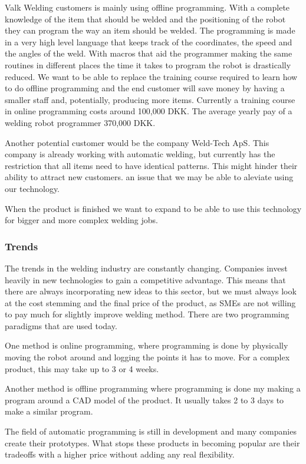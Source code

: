 Valk Welding customers is mainly using offline programming.
With a complete knowledge of the item that should be welded and the positioning of the robot they can program the way an item should be welded.
The programming is made in a very high level language that keeps track of the coordinates, the speed and the angles of the weld.
With macros that aid the programmer making the same routines in different places the time it takes to program the robot is drastically reduced.
We want to be able to replace the training course required to learn how to do offline programming and the end customer will save money by having a smaller staff and, potentially, producing more items. 
Currently a training course in online programming costs around 100,000 DKK\cite{valk_welding_summary}. 
The average yearly pay of a welding robot programmer 370,000 DKK\cite{welding_salary}. 

Another potential customer would be the company Weld-Tech ApS. 
This company is already working with automatic welding, but currently has the restriction that all items need to have identical patterns. 
This might hinder their ability to attract new customers. an issue that we may be able to aleviate using our technology.

When the product is finished we want to expand to be able to use this technology for bigger and more complex welding jobs.

\subsubsection{Trends}
The trends in the welding industry are constantly changing. 
Companies invest heavily in new technologies to gain a competitive advantage. 
This means that there are always incorporating new ideas to this sector, but we must always look at the cost stemming and the final price of the product, as SMEs are not willing to pay much for slightly improve welding method.
There are two programming paradigms that are used today.

One method is online programming, where programming is done by physically moving the robot around and logging the points it has to move. For a complex product, this may take up to 3 or 4 weeks.

Another method is offline programming where programming is done my making a program around a CAD model of the product.
It usually takes 2 to 3 days to make a similar program.

The field of automatic programming is still in development and many companies create their prototypes. 
What stops these products in becoming popular are their tradeoffs with a higher price without adding any real flexibility.
